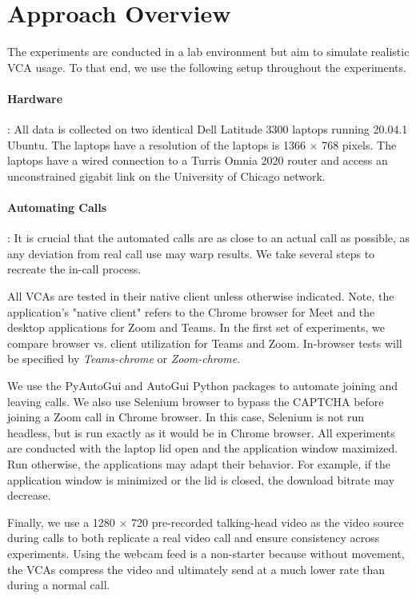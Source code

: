 \section{Approach Overview}\label{sec:approach}

The experiments are conducted in a lab environment but aim to simulate realistic VCA usage. To that end, we use the following setup throughout the experiments.

\paragraph{Hardware}: All data is collected on two identical Dell Latitude 3300 laptops running 20.04.1 Ubuntu. The laptops have a resolution of the laptops is 1366 $\times$ 768 pixels. The laptops have a wired connection to a Turris Omnia 2020 router and access an unconstrained gigabit link on the University of Chicago network. 

\paragraph{Automating Calls}: It is crucial that the automated calls are as close to an actual call as possible, as any deviation from real call use may warp results. We take several steps to recreate the in-call process.

All VCAs are tested in their native client unless otherwise indicated. Note, the application's "native client" refers to the Chrome browser for Meet and the desktop applications for Zoom and Teams. In the first set of experiments, we compare browser vs. client utilization for Teams and Zoom. In-browser tests will be specified by \textit{Teams-chrome} or \textit{Zoom-chrome}. 

We use the PyAutoGui and AutoGui Python packages to automate joining and leaving calls. We also use Selenium browser to bypass the CAPTCHA before joining a Zoom call in Chrome browser. In this case, Selenium is not run headless, but is run exactly as it would be in Chrome browser. All experiments are conducted with the laptop lid open and the application window maximized. Run otherwise, the applications may adapt their behavior. For example, if the application window is minimized or the lid is closed, the download bitrate may decrease.

Finally, we use a 1280 $\times$ 720 pre-recorded talking-head video as the video source during calls to both replicate a real video call and ensure consistency across experiments. Using the webcam feed is a non-starter because without movement, the VCAs compress the video and ultimately send at a much lower rate than during a normal call. 


